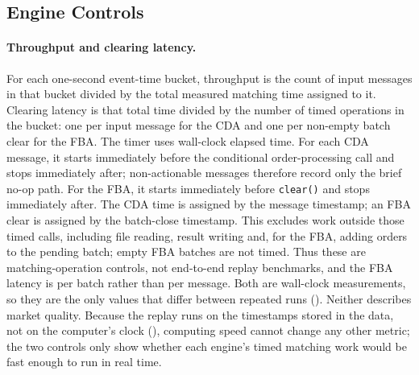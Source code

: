\subsection{Engine Controls}
\label{sec:metricscontrol}

\paragraph{Throughput and clearing latency.} For each one-second
event-time bucket, throughput is the count of input messages in that bucket
divided by the total measured matching time assigned to it. Clearing
latency is that total time divided by the number of timed operations in the
bucket: one per input message for the CDA and one per non-empty batch clear
for the FBA. The timer uses wall-clock elapsed time. For each CDA message,
it starts immediately before the conditional order-processing call and
stops immediately after; non-actionable messages therefore record only the
brief no-op path. For the FBA, it starts immediately before
\texttt{clear()} and stops immediately after. The CDA time is assigned by
the message timestamp; an FBA clear is assigned by the batch-close
timestamp. This excludes work outside those timed calls, including file
reading, result writing and, for the FBA, adding orders to the pending
batch; empty FBA batches are not timed. Thus these are matching-operation
controls, not end-to-end replay benchmarks, and the FBA latency is per
batch rather than per message. Both are wall-clock measurements, so they
are the only values that differ between repeated runs
(). Neither describes market quality. Because the
replay runs on the timestamps stored in the data, not on the computer's
clock (), computing speed cannot change any other
metric; the two controls only show whether each engine's timed matching
work would be fast enough to run in real time.
